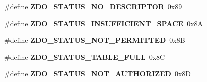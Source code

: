 \begin{DoxyCompactItemize}
\item 
\mbox{\label{group__zdo_ga6e2e64f9a8999b8334de157c6c0cdad1}} 
\#define {\bfseries Z\+D\+O\+\_\+\+S\+T\+A\+T\+U\+S\+\_\+\+N\+O\+\_\+\+D\+E\+S\+C\+R\+I\+P\+T\+OR}~0x89
\item 
\mbox{\label{group__zdo_ga8e834faf1232208d667ff946fd9ae1ab}} 
\#define {\bfseries Z\+D\+O\+\_\+\+S\+T\+A\+T\+U\+S\+\_\+\+I\+N\+S\+U\+F\+F\+I\+C\+I\+E\+N\+T\+\_\+\+S\+P\+A\+CE}~0x8A
\item 
\mbox{\label{group__zdo_ga74c9f08daf978af42a89f710a3ac0549}} 
\#define {\bfseries Z\+D\+O\+\_\+\+S\+T\+A\+T\+U\+S\+\_\+\+N\+O\+T\+\_\+\+P\+E\+R\+M\+I\+T\+T\+ED}~0x8B
\item 
\mbox{\label{group__zdo_gab2f02cd6c716a5217aa9671dfc657872}} 
\#define {\bfseries Z\+D\+O\+\_\+\+S\+T\+A\+T\+U\+S\+\_\+\+T\+A\+B\+L\+E\+\_\+\+F\+U\+LL}~0x8C
\item 
\mbox{\label{group__zdo_gac1b973f9681f4bbf319244d55ca6d2cd}} 
\#define {\bfseries Z\+D\+O\+\_\+\+S\+T\+A\+T\+U\+S\+\_\+\+N\+O\+T\+\_\+\+A\+U\+T\+H\+O\+R\+I\+Z\+ED}~0x8D
\end{DoxyCompactItemize}
